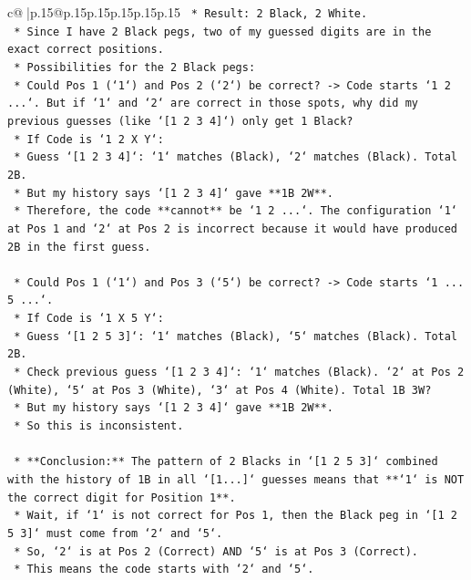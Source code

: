 \documentclass{article}
\begin{document}
{\begin{supertabular}{c@{$\;$}|p{.15\linewidth}@{}p{.15\linewidth}p{.15\linewidth}p{.15\linewidth}p{.15\linewidth}p{.15\linewidth}}
{{{\texttt{        *   Result: 2 Black, 2 White.} \\
\texttt{    *   Since I have 2 Black pegs, two of my guessed digits are in the exact correct positions.} \\
\texttt{    *   Possibilities for the 2 Black pegs:} \\
\texttt{        *   Could Pos 1 (`1`) and Pos 2 (`2`) be correct? {-}> Code starts `1 2 ...`. But if `1` and `2` are correct in those spots, why did my previous guesses (like `{[}1 2 3 4{]}`) only get 1 Black?} \\
\texttt{            *   If Code is `1 2 X Y`:} \\
\texttt{            *   Guess `{[}1 2 3 4{]}`: `1` matches (Black), `2` matches (Black). Total 2B.} \\
\texttt{            *   But my history says `{[}1 2 3 4{]}` gave **1B 2W**.} \\
\texttt{            *   Therefore, the code **cannot** be `1 2 ...`. The configuration `1` at Pos 1 and `2` at Pos 2 is incorrect because it would have produced 2B in the first guess.} \\
\\ 
\texttt{        *   Could Pos 1 (`1`) and Pos 3 (`5`) be correct? {-}> Code starts `1 ... 5 ...`.} \\
\texttt{            *   If Code is `1 X 5 Y`:} \\
\texttt{            *   Guess `{[}1 2 5 3{]}`: `1` matches (Black), `5` matches (Black). Total 2B.} \\
\texttt{            *   Check previous guess `{[}1 2 3 4{]}`: `1` matches (Black). `2` at Pos 2 (White), `5` at Pos 3 (White), `3` at Pos 4 (White). Total 1B 3W?} \\
\texttt{            *   But my history says `{[}1 2 3 4{]}` gave **1B 2W**.} \\
\texttt{            *   So this is inconsistent.} \\
\\ 
\texttt{        *   **Conclusion:** The pattern of 2 Blacks in `{[}1 2 5 3{]}` combined with the history of 1B in all `{[}1...{]}` guesses means that **`1` is NOT the correct digit for Position 1**.} \\
\texttt{    *   Wait, if `1` is not correct for Pos 1, then the Black peg in `{[}1 2 5 3{]}` must come from `2` and `5`.} \\
\texttt{    *   So, `2` is at Pos 2 (Correct) AND `5` is at Pos 3 (Correct).} \\
\texttt{    *   This means the code starts with `2` and `5`.} \\
}}}
\end{supertabular}}
\end{document}
